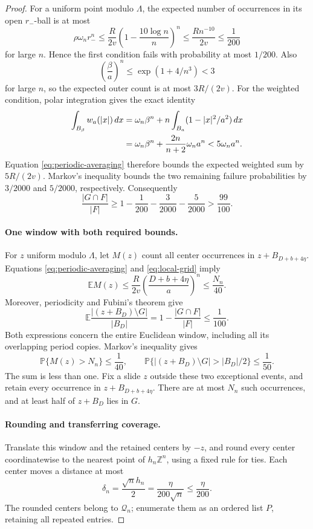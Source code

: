 \begin{proof}
For a uniform point modulo $\Lambda$, the expected number of occurrences
in its open $r_-$-ball is at most
\[
 \rho\omega_n r_-^n
 \le\frac{R}{2v}
       \left(1-\frac{10\log n}{n}\right)^n
 \le\frac{R n^{-10}}{2v}
 \le\frac1{200}
\]
for large $n$.  Hence the first condition fails with probability at most
$1/200$.  Also
\[
 \left(\frac\beta a\right)^n
 \le\exp(1+4/n^3)<3
\]
for large $n$, so the expected outer count is at most $3R/(2v)$.
For the weighted condition, polar integration gives the exact identity
\begin{align}
 \int_{B_\beta}w_a(|x|)\,dx
 &=\omega_n\beta^n
      +n\int_{B_a}(1-|x|^2/a^2)\,dx\notag\\
 &=\omega_n\beta^n+\frac{2n}{n+2}\omega_na^n
 <5\omega_na^n.\label{eq:weighted-ball-integral}
\end{align}
Equation \eqref{eq:periodic-averaging} therefore bounds the expected
weighted sum by $5R/(2v)$.  Markov's inequality bounds the two remaining
failure probabilities by $3/2000$ and $5/2000$, respectively.  Consequently
\begin{equation}\label{eq:periodic-good-volume}
 \frac{|G\cap F|}{|F|}
 \ge1-\frac1{200}-\frac3{2000}-\frac5{2000}
 >\frac{99}{100}.
\end{equation}

\paragraph{One window with both required bounds.}
For $z$ uniform modulo $\Lambda$, let $M(z)$ count all center occurrences
in $z+B_{D+b+4\eta}$.  Equations \eqref{eq:periodic-averaging} and
\eqref{eq:local-grid} imply
\[
 \mathbb{E} M(z)
 \le\frac{R}{2v}\left(\frac{D+b+4\eta}{a}\right)^n
 \le\frac{N_n}{40}.
\]
Moreover, periodicity and Fubini's theorem give
\[
 \mathbb{E}\frac{|(z+B_D)\setminus G|}{|B_D|}
 =1-\frac{|G\cap F|}{|F|}\le\frac1{100}.
\]
Both expressions concern the entire Euclidean window, including all its
overlapping period copies.  Markov's inequality gives
\[
 \mathbb{P}\{M(z)>N_n\}\le\frac1{40},\qquad
 \mathbb{P}\{|(z+B_D)\setminus G|>|B_D|/2\}\le\frac1{50}.
\]
The sum is less than one.  Fix a slide $z$ outside these two exceptional
events, and retain every occurrence in $z+B_{D+b+4\eta}$.  There are at
most $N_n$ such occurrences, and at least half of $z+B_D$ lies in $G$.

\paragraph{Rounding and transferring coverage.}
Translate this window and the retained centers by $-z$, and round every
center coordinatewise to the nearest point of $h_n\mathbb Z^n$, using a
fixed rule for ties.  Each center moves a distance at most
\begin{equation}\label{eq:rounding-error}
 \delta_n=\frac{\sqrt n h_n}{2}
         =\frac{\eta}{200\sqrt n}\le\frac\eta{200}.
\end{equation}
The rounded centers belong to $\mathcal Q_n$; enumerate them as an ordered
list $P$, retaining all repeated entries.


\end{proof}
